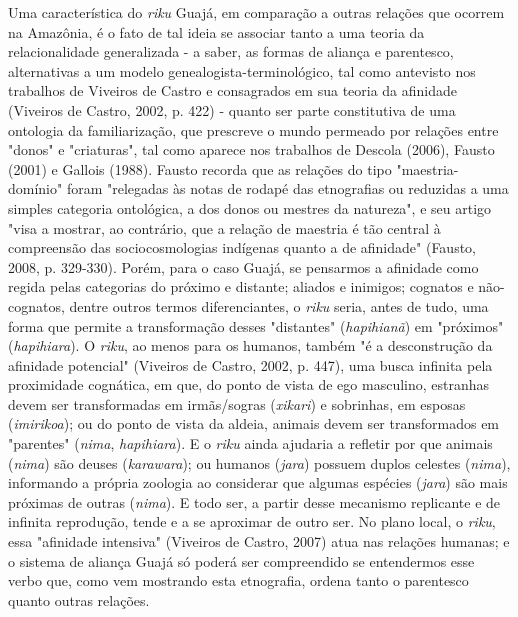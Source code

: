 Uma característica do \emph{riku} Guajá, em comparação a outras relações
que ocorrem na Amazônia, é o fato de tal ideia se associar tanto a uma
teoria da relacionalidade generalizada - a saber, as formas de aliança e
parentesco, alternativas a um modelo genealogista-terminológico, tal
como antevisto nos trabalhos de Viveiros de Castro e consagrados em sua
teoria da afinidade (Viveiros de Castro, 2002, p. 422) - quanto ser
parte constitutiva de uma ontologia da familiarização, que prescreve o
mundo permeado por relações entre "donos" e "criaturas", tal como
aparece nos trabalhos de Descola (2006), Fausto (2001) e Gallois (1988).
Fausto recorda que as relações do tipo "maestria-domínio" foram
"relegadas às notas de rodapé das etnografias ou reduzidas a uma simples
categoria ontológica, a dos donos ou mestres da natureza", e seu artigo
"visa a mostrar, ao contrário, que a relação de maestria é tão central à
compreensão das sociocosmologias indígenas quanto a de afinidade"
(Fausto, 2008, p. 329-330). Porém, para o caso Guajá, se pensarmos a
afinidade como regida pelas categorias do próximo e distante; aliados e
inimigos; cognatos e não-cognatos, dentre outros termos diferenciantes,
o \emph{riku} seria, antes de tudo, uma forma que permite a
transformação desses "distantes" (\emph{hapihianã}) em "próximos"
(\emph{hapihiara}). O \emph{riku}, ao menos para os humanos, também "é a
desconstrução da afinidade potencial" (Viveiros de Castro, 2002, p.
447), uma busca infinita pela proximidade cognática, em que, do ponto de
vista de ego masculino, estranhas devem ser transformadas em
irmãs/sogras (\emph{xikari}) e sobrinhas, em esposas (\emph{imirikoa});
ou do ponto de vista da aldeia, animais devem ser transformados em
"parentes" (\emph{nima}, \emph{hapihiara}). E o \emph{riku} ainda
ajudaria a refletir por que animais (\emph{nima}) são deuses
(\emph{karawara}); ou humanos (\emph{jara}) possuem duplos celestes
(\emph{nima}), informando a própria zoologia ao considerar que algumas
espécies (\emph{jara}) são mais próximas de outras (\emph{nima}). E todo
ser, a partir desse mecanismo replicante e de infinita reprodução, tende
e a se aproximar de outro ser. No plano local, o \emph{riku}, essa
"afinidade intensiva" (Viveiros de Castro, 2007) atua nas relações
humanas; e o sistema de aliança Guajá só poderá ser compreendido se
entendermos esse verbo que, como vem mostrando esta etnografia, ordena
tanto o parentesco quanto outras relações.

